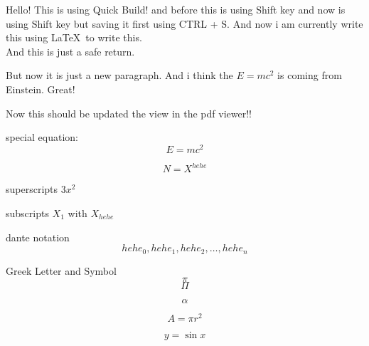 \documentclass[11pt]{article}
\begin{document}
Hello! This is using Quick Build! and before this is using Shift key and now is using Shift key but saving it first using CTRL + S. And now i am currently write this using \LaTeX\ to write this. \\And this is just a safe return.

But now it is just a new paragraph. And i think the $E=mc^2$ is coming from Einstein. Great!

Now this should be updated the view in the pdf viewer!!	

special equation:
$$E=mc^2$$

$$N = X^{hehe}$$

superscripts $3x^2$

subscripts $X_1$ with $X_{hehe}$

dante notation
$$hehe_0, hehe_1, hehe_2, \ldots, hehe_n$$


Greek Letter and Symbol
$$\pi$$
$$\Pi$$

$$\alpha$$

$$A=\pi r^2$$

$$y= \sin x$$
\end{document}
